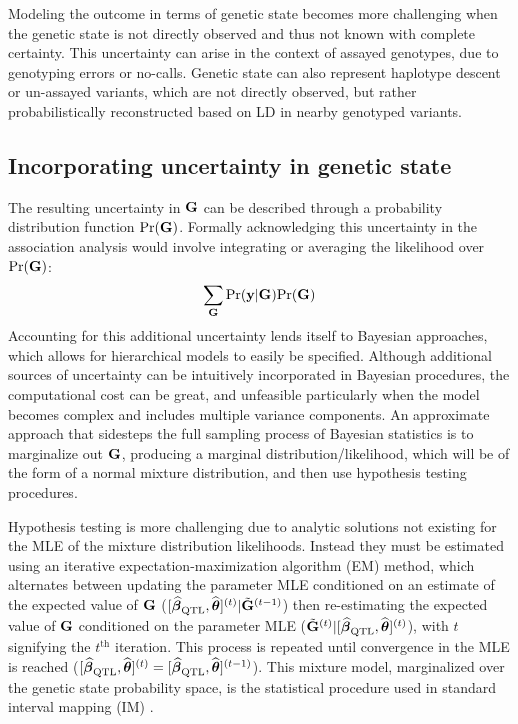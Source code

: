 Modeling the outcome in terms of genetic state becomes more challenging when the genetic state is not directly observed and thus not known with complete certainty. This uncertainty can arise in the context of assayed genotypes, due to genotyping errors or no-calls. Genetic state can also represent haplotype descent or un-assayed variants, which are not directly observed, but rather probabilistically reconstructed based on LD in nearby genotyped variants.

\subsection{Incorporating uncertainty in genetic state}
The resulting uncertainty in $\mathbf{G}$ can be described through a probability distribution function $\text{Pr}(\mathbf{G})$. Formally acknowledging this uncertainty in the association analysis would involve integrating or averaging the likelihood over $\text{Pr}(\mathbf{G})$:
\begin{equation*}
	\sum_{\mathbf{G}}\text{Pr}(\mathbf{y}|\mathbf{G})\text{Pr}(\mathbf{G})
\end{equation*} 
Accounting for this additional uncertainty lends itself to Bayesian approaches, which allows for hierarchical models to easily be specified. Although additional sources of uncertainty can be intuitively incorporated in Bayesian procedures, the computational cost can be great, and unfeasible particularly when the model becomes complex and includes multiple variance components. An approximate approach that sidesteps the full sampling process of Bayesian statistics is to marginalize out $\mathbf{G}$, producing a marginal distribution/likelihood, which will be of the form of a normal mixture distribution, and then use hypothesis testing procedures. 

Hypothesis testing is more challenging due to analytic solutions not existing for the MLE of the mixture distribution likelihoods. Instead they must be estimated using an iterative expectation-maximization algorithm (EM) method, which alternates between updating the parameter MLE conditioned on an estimate of the expected value of $\mathbf{G}$ ($[\boldsymbol{\widehat{\beta}}_{\text{QTL}}, \widehat{\boldsymbol{\theta}}]^{(t)} | \tilde{\mathbf{G}}^{(t-1)}$) then re-estimating the expected value of $\mathbf{G}$ conditioned on the parameter MLE ($\tilde{\mathbf{G}}^{(t)} | [\boldsymbol{\widehat{\beta}}_{\text{QTL}}, \widehat{\boldsymbol{\theta}}]^{(t)}$), with $t$ signifying the $t^{\text{th}}$ iteration. This process is repeated until convergence in the MLE is reached ($[\boldsymbol{\widehat{\beta}}_{\text{QTL}}, \widehat{\boldsymbol{\theta}}]^{(t)} = [\boldsymbol{\widehat{\beta}}_{\text{QTL}}, \widehat{\boldsymbol{\theta}}]^{(t-1)}$). This mixture model, marginalized over the genetic state probability space, is the statistical procedure used in standard interval mapping (IM) \citep{Lander1989}. 


